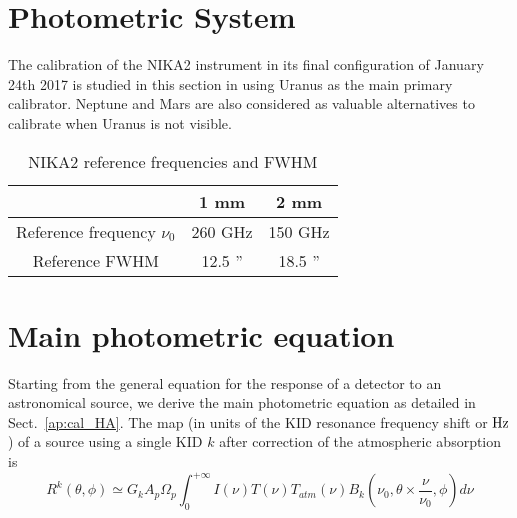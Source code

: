 %






\section{Photometric System}%
\label{se:cal_HA_reference}

The calibration of the NIKA2 instrument in its final configuration of
January 24th 2017 is studied in this section in using Uranus as the
main primary calibrator. Neptune and Mars are also considered as
valuable alternatives to calibrate when Uranus is not visible.

\begin{table}[h]
\begin{center}
\begin{tabular}{|c|c|c|}
\hline
     & 1 mm & 2 mm \\
\hline
Reference frequency $\nu_{0}$ & 260 GHz & 150 GHz \\
\hline
Reference FWHM                      & 12.5  '' & 18.5 '' \\
\hline
\end{tabular}
\caption{NIKA2 reference frequencies and FWHM}
\end{center}
\label{tab:definitions}
\end{table}

\section{Main photometric equation}
\label{se:cal_HA_main}

Starting from the general equation for the response of a detector to
an astronomical source, we derive the main photometric equation as
detailed in Sect.~\ref{ap:cal_HA}.
The map (in units of the KID resonance frequency shift or $\rm Hz$) of a source using a single KID $k$
after correction of the atmospheric absorption is
\begin{equation}
R^{k}(\theta, \phi) \simeq G_{k}  A_{p}\Omega_{p} \int_{0}^{+\infty} I(\nu)
T(\nu) T_{atm}(\nu) B_{k}(\nu_{0}, \theta \times \frac{\nu}{\nu_{0}},
\phi) d\nu 
\label{eq:mainphot}
\end{equation}

